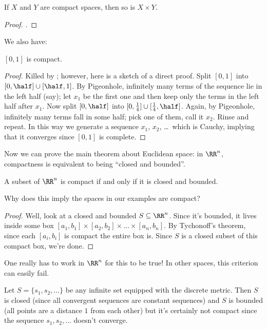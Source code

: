 \begin{theorem}
	\label{thm:tychonoff}
	If $X$ and $Y$ are compact spaces, then so is $X \times Y$.
\end{theorem}
\begin{proof}
	.
\end{proof}

We also have:
\begin{theorem}
	\label{thm:interval_compact}
	$[0,1]$ is compact.
\end{theorem}
\begin{proof}
	Killed by ;
	however, here is a sketch of a direct proof.
	Split $[0,1]$ into $[0,\half] \cup [\half,1]$.
	By Pigeonhole, infinitely many terms of the sequence lie in the left half (say);
	let $x_1$ be the first one and then keep only the terms in the left half after $x_1$.
	Now split $[0, \half]$ into $[0,\frac14] \cup [\frac14,\half]$.
	Again, by Pigeonhole, infinitely many terms fall in some half; pick one of them, call it $x_2$.
	Rinse and repeat.
	In this way we generate a sequence $x_1$, $x_2$, \dots\ which is Cauchy,
	implying that it converges since $[0,1]$ is complete.
\end{proof}

Now we can prove the main theorem about Euclidean space:
in $\RR^n$, compactness is equivalent to being ``closed and bounded''.
\begin{theorem}
	A subset of $\RR^n$ is compact if and only if it is closed and bounded.
	\label{thm:fakeBW}
\end{theorem}
\begin{ques}
	Why does this imply the spaces in our examples are compact?
\end{ques}
\begin{proof}
	Well, look at a closed and bounded $S \subseteq \RR^n$.
	Since it's bounded, it lives inside some box $[a_1, b_1] \times [a_2, b_2] \times \dots \times [a_n, b_n]$.
	By Tychonoff's theorem, since each $[a_i, b_i]$ is compact the entire box is.
	Since $S$ is a closed subset of this compact box, we're done.
\end{proof}

One really has to work in $\RR^n$ for this to be true!
In other spaces, this criterion can easily fail.
\begin{example}
	Let $S = \{s_1, s_2, \dots\}$ be any infinite set equipped with the discrete metric.
	Then $S$ is closed (since all convergent sequences are constant sequences)
	and $S$ is bounded (all points are a distance $1$ from each other)
	but it's certainly not compact since the sequence $s_1, s_2, \dots$ doesn't converge.
\end{example}

